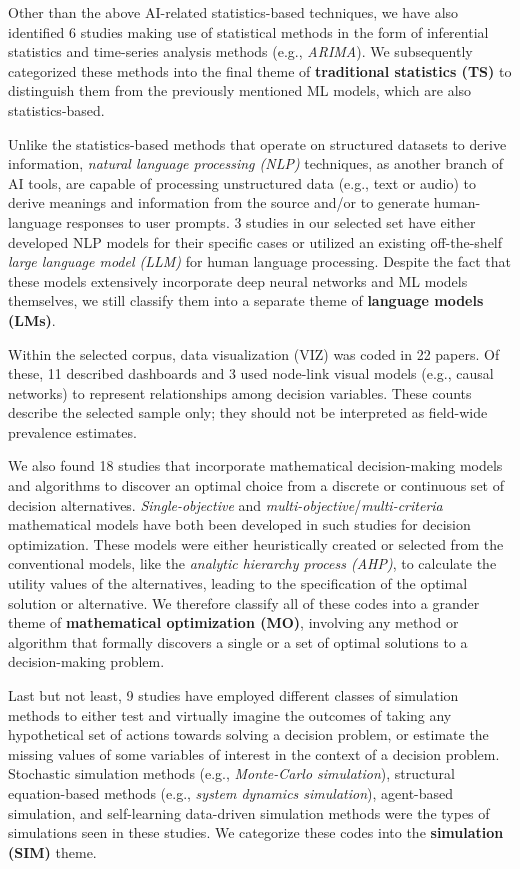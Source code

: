 \documentclass{sfuthesis}
\begin{document}
Other than the above AI-related statistics-based techniques, we have also identified 6 studies making use of statistical methods in the form of inferential statistics and time-series analysis methods (e.g., \textit{ARIMA}). We subsequently categorized these methods into the final theme of \textbf{traditional statistics (TS)} to distinguish them from the previously mentioned ML models, which are also statistics-based.\par
Unlike the statistics-based methods that operate on structured datasets to derive information, \textit{natural language processing (NLP)} techniques, as another branch of AI tools, are capable of processing unstructured data (e.g., text or audio) to derive meanings and information from the source and/or to generate human-language responses to user prompts. 3 studies in our selected set have either developed NLP models for their specific cases or utilized an existing off-the-shelf \textit{large language model (LLM)} for human language processing. Despite the fact that these models extensively incorporate deep neural networks and ML models themselves, we still classify them into a separate theme of \textbf{language models (LMs)}.\par
Within the selected corpus, data visualization (VIZ) was coded in 22 papers. Of these, 11 described dashboards and 3 used node-link visual models (e.g., causal networks) to represent relationships among decision variables. These counts describe the selected sample only; they should not be interpreted as field-wide prevalence estimates.\par
We also found 18 studies that incorporate mathematical decision-making models and algorithms to discover an optimal choice from a discrete or continuous set of decision alternatives. \textit{Single-objective} and \textit{multi-objective}/\textit{multi-criteria} mathematical models have both been developed in such studies for decision optimization. These models were either heuristically created or selected from the conventional models, like the \textit{analytic hierarchy process (AHP)}, to calculate the utility values of the alternatives, leading to the specification of the optimal solution or alternative. We therefore classify all of these codes into a grander theme of \textbf{mathematical optimization (MO)}, involving any method or algorithm that formally discovers a single or a set of optimal solutions to a decision-making problem.\par
Last but not least, 9 studies have employed different classes of simulation methods to either test and virtually imagine the outcomes of taking any hypothetical set of actions towards solving a decision problem, or estimate the missing values of some variables of interest in the context of a decision problem. Stochastic simulation methods (e.g., \textit{Monte-Carlo simulation}), structural equation-based methods (e.g., \textit{system dynamics simulation}), agent-based simulation, and self-learning data-driven simulation methods were the types of simulations seen in these studies. We categorize these codes into the \textbf{simulation (SIM)} theme.
\end{document}
